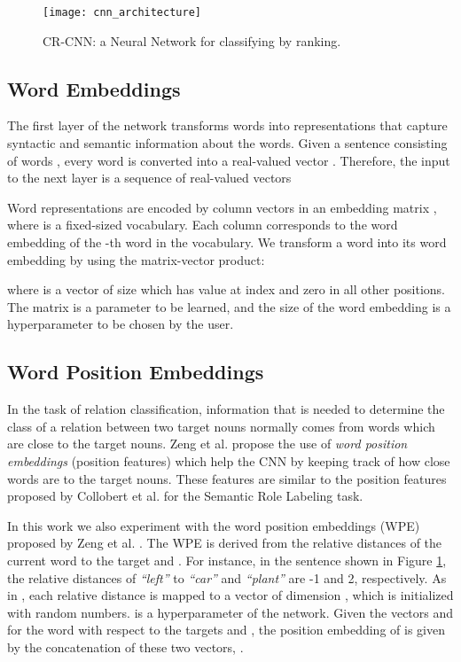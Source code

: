\documentclass[11pt]{article}
\begin{document}
\begin{figure}[t]
  \centering
    \texttt{[image: cnn\_architecture]}
  \caption{CR-CNN: a Neural Network for classifying by ranking.}
  \label{fig:cnn_pic}
\end{figure}

\subsection{Word Embeddings}
\label{sec:wordrepr}
The first layer of the network transforms words into representations that capture syntactic and semantic information about the words.
Given a sentence  consisting of  words , 
every word  is converted into a real-valued vector .
Therefore, 
the input to the next layer is a sequence of real-valued vectors 

Word representations are encoded by column vectors in an embedding matrix ,
where  is a fixed-sized vocabulary.
Each column  corresponds to the word embedding of the -th word in the vocabulary.
We transform a word  into its word embedding  by using the matrix-vector product: 

where  is a vector of size  which has value  at index  and zero in all other positions.
The matrix  is a parameter to be learned,
and the size of the word embedding  is a hyperparameter to be chosen by the user.

\subsection{Word Position Embeddings}
In the task of relation classification,
information that is needed to determine the class of a relation between two target nouns normally comes from words which are close to the target nouns.
Zeng et al.  propose the use of \emph{word position embeddings} (position features) which help the CNN by keeping track of how close words are to the target nouns.
These features are similar to the position features proposed by Collobert et al.  for the Semantic Role Labeling task.

In this work we also experiment with the word position embeddings (WPE) proposed by Zeng et al. .
The WPE is derived from the relative distances of the current word to the target  and . 
For instance, 
in the sentence shown in Figure \ref{fig:cnn_pic},
the relative distances of \emph{“left”} to \emph{“car”} and \emph{“plant”} are -1
and 2, 
respectively. 
As in \cite{collobert2011:jmlr},
each relative distance is mapped to a vector of dimension ,
which is initialized with random numbers.
 is a hyperparameter of the network.
Given the vectors  and  for the word  with respect to the targets  and ,
the position embedding of  is given by the concatenation of these two vectors, .
\end{document}
